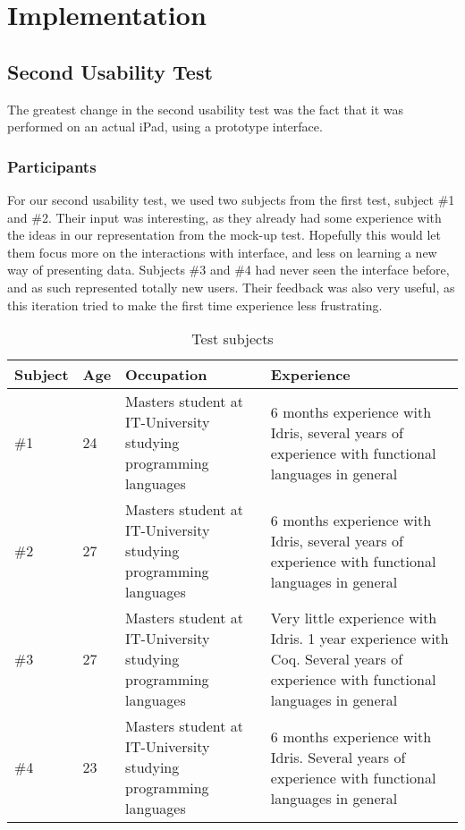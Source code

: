 \section{Implementation}
\label{sec:Implementation}

\subsection{Second Usability Test}
\label{sec:SecondUsabilityTest}
The greatest change in the second usability test was the fact that it was
performed on an actual iPad, using a prototype interface. 

\subsubsection{Participants}
For our second usability test, we used two subjects from the first test,
subject \#1 and \#2. Their input was interesting, as they already had some
experience with the ideas in our representation from the mock-up test.
Hopefully this would let them focus more on the interactions with interface,
and less on learning a new way of presenting data. Subjects \#3 and \#4 had
never seen the interface before, and as such represented totally new users.
Their feedback was also very useful, as this iteration tried to make the first
time experience less frustrating.

\begin{table}[h]
\centering
\begin{tabular}{| l | l | p{5cm} | p{5cm} |}
\hline
Subject & Age & Occupation & Experience \\ \hline
\#1 & 24 & Masters student at IT-University studying programming languages & 6 months experience with Idris, several years of experience with functional languages in general \\ \hline
\#2 & 27 & Masters student at IT-University studying programming languages & 6 months experience with Idris, several years of experience with functional languages in general \\ \hline
\#3 & 27 & Masters student at IT-University studying programming languages & Very little experience with Idris. 1 year experience with Coq. Several years of experience with functional languages in general \\ \hline
\#4 & 23 & Masters student at IT-University studying programming languages & 6 months experience with Idris. Several years of experience with functional languages in general \\ \hline
\end{tabular}
\caption {Test subjects}
\label{table:second_test_subjects}
\end{table}

